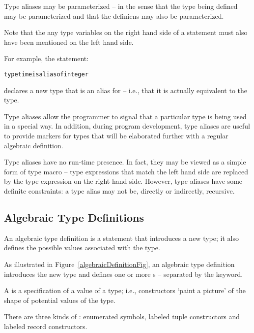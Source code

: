 \begin{aside}
Type aliases may be parameterized -- in the sense that the type being defined may be parameterized and that the definiens may also be parameterized.

Note that the any type variables on the right hand side of a  statement must also have been mentioned on the left hand side.
\end{aside}

For example, the statement:
\begin{alltt}
type time is alias of integer
\end{alltt}
declares a new type that is an alias for  -- i.e., that it is actually equivalent to the  type.
\begin{aside}
Type aliases allow the programmer to signal that a particular type is being used in a special way. In addition, during program development, type aliases are useful to provide markers for types that will be elaborated further with a regular algebraic definition.
\end{aside}
\begin{aside}
Type aliases have no run-time presence. In fact, they may be viewed as a simple form of type macro -- type expressions that match the left hand side are replaced by the type expression on the right hand side. However, type aliases have some definite constraints: a type alias may not be, directly or indirectly, recursive.
\end{aside}

\subsection{Algebraic Type Definitions}
\label{algebraicTypeDefinitions}
An algebraic type definition is a statement that introduces a new type; it also defines the possible values associated with the type.

As illustrated in Figure~\vref{algebraicDefinitionFig}, an algebraic type definition introduces the new type and defines one or more s -- separated by the  keyword.

A  is a specification of a value of a type; i.e., constructors `paint a picture' of the shape of potential values of the type.

There are three kinds of : enumerated symbols, labeled tuple constructors and labeled record constructors.

